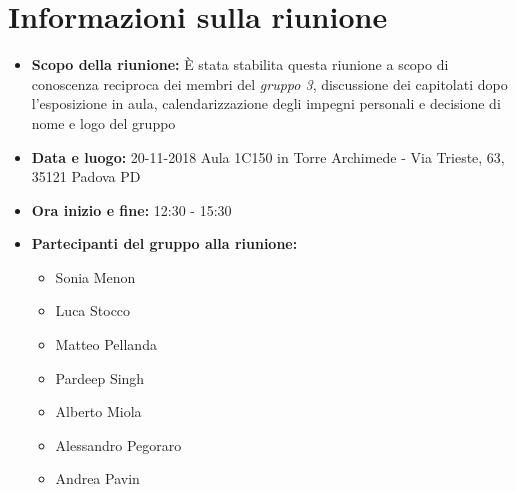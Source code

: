 \clearpage
\section{Informazioni sulla riunione}
\begin{itemize}
	\item \textbf {Scopo della riunione:} È stata stabilita questa riunione a scopo di conoscenza reciproca dei membri del \emph{gruppo 3}, discussione dei capitolati  dopo l’esposizione in aula, calendarizzazione degli impegni personali e decisione di nome e logo del gruppo
	
	\item \textbf {Data e luogo:} 20-11-2018 Aula 1C150 in Torre Archimede - Via Trieste, 63, 35121 Padova PD
	
	\item \textbf {Ora inizio e fine:} 12:30 - 15:30
	
	\item \textbf {Partecipanti del gruppo alla riunione:} 
		 \begin{itemize}
			\item Sonia Menon
			\item Luca Stocco
			\item Matteo Pellanda
			\item Pardeep Singh
			\item Alberto Miola
			\item Alessandro Pegoraro
			\item Andrea Pavin
		\end{itemize}
\end{itemize}